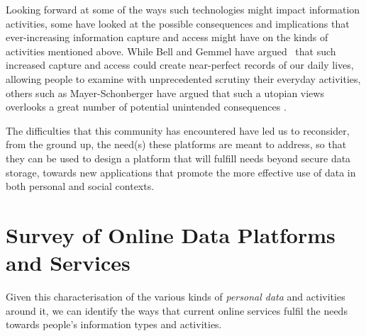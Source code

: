 \documentclass[graybox]{svmult}
\begin{document}

Looking forward at some of the ways such technologies might impact information activities, some have looked at the possible consequences and implications that ever-increasing information capture and access might have on the kinds of activities mentioned above.  While Bell and Gemmel have argued~\cite{bell2010total} that such increased capture and access could create near-perfect records of our daily lives, allowing people to examine with unprecedented scrutiny their everyday activities, others such as Mayer-Schonberger have argued that such a utopian views overlooks a great number of potential unintended consequences \cite{mayer-schonberger2013}.   


The difficulties that this community has encountered have led us to reconsider, from the ground up, the need(s) these platforms are meant to address, so that they can be used to design a platform that will fulfill needs beyond secure data storage, towards new applications that promote the more effective use of data in both personal and social contexts.

\section{Survey of Online Data Platforms and Services}

Given this characterisation of the various kinds of \emph{personal data} and activities around it, we can identify the ways that current online services fulfil the needs towards people's information types and activities.  
\end{document}
